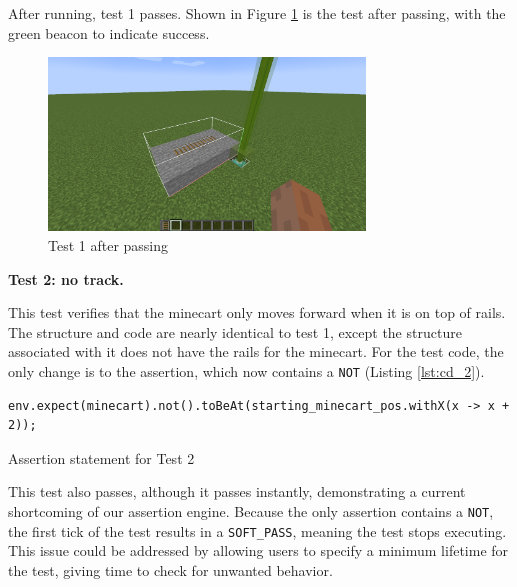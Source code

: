 \documentclass[12pt]{article}
\def\code#1{\texttt{#1}}
\begin{document}
\begin{onehalfspacing}
After running, test 1 passes. Shown in Figure \ref{fig:5_1_1_2} is the test after
passing, with the green beacon to indicate success.

\begin{figure}[H] 
    \centering
    \includegraphics[width=0.75\textwidth]{media/media/image12.png} 
    \caption{Test 1 after passing} 
    \label{fig:5_1_1_2}  
\end{figure}


\noindent\textbf{Test 2: no track.}

This test verifies that the minecart only moves forward when it is on
top of rails. The structure and code are nearly identical to test 1,
except the structure associated with it does not have the rails for the
minecart. For the test code, the only change is to the assertion, which
now contains a \code{NOT} (Listing \ref{lst:cd_2}).



\begin{listing}[H]
\begin{verbatim}
env.expect(minecart).not().toBeAt(starting_minecart_pos.withX(x -> x + 2));
\end{verbatim}
\caption{Assertion statement for Test 2}
\label{lst:cd_2}
\end{listing}


This test also passes, although it passes instantly, demonstrating a
current shortcoming of our assertion engine. Because the only assertion
contains a \code{NOT}, the first tick of the test results in a \code{SOFT\_PASS},
meaning the test stops executing. This issue could be addressed by
allowing users to specify a minimum lifetime for the test, giving time
to check for unwanted behavior.


\end{onehalfspacing}
\end{document}
